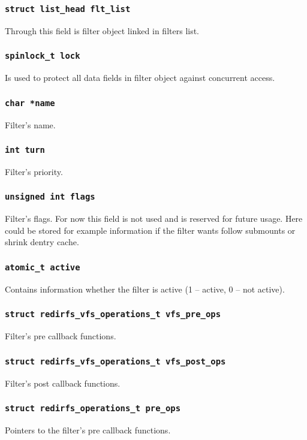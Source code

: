 \subsubsection{\texttt{struct list\_head flt\_list}}
Through this field is filter object linked in filters list.

\subsubsection{\texttt{spinlock\_t lock}}
Is used to protect all data fields in filter object against concurrent access.

\subsubsection{\texttt{char *name}}
Filter's name.

\subsubsection{\texttt{int turn}}
Filter's priority.

\subsubsection{\texttt{unsigned int flags}}
Filter's flags. For now this field is not used and is reserved for future usage.
Here could be stored for example information if the filter wants follow submounts or
shrink dentry cache.

\subsubsection{\texttt{atomic\_t active}}
Contains information whether the filter is active (1 -- active, 0 -- not active).

\subsubsection{\texttt{struct redirfs\_vfs\_operations\_t vfs\_pre\_ops}}
Filter's pre callback functions.

\subsubsection{\texttt{struct redirfs\_vfs\_operations\_t vfs\_post\_ops}}
Filter's post callback functions.

\subsubsection{\texttt{struct redirfs\_operations\_t pre\_ops}}
Pointers to the filter's pre callback functions.

